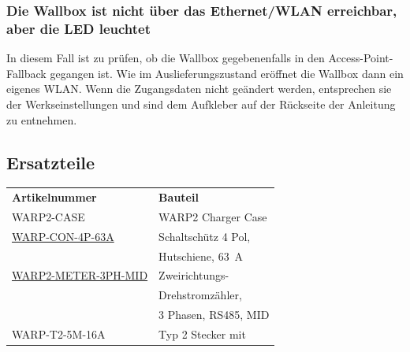 \documentclass[a4paper,10pt]{article}
\begin{document}
\begin{multicols*}{2}
	\subsubsection*{Die Wallbox ist nicht über das Ethernet/WLAN erreichbar, aber die LED leuchtet}
	In diesem Fall ist zu prüfen, ob die Wallbox gegebenenfalls in den Access-Point-Fallback
	gegangen ist. Wie im Auslieferungszustand eröffnet die Wallbox dann ein eigenes
	WLAN. Wenn die Zugangsdaten nicht geändert werden, entsprechen sie der Werkseinstellungen und sind dem
	Aufkleber auf der Rückseite der Anleitung zu entnehmen.

	\subsection{Ersatzteile}
	\begin{tabular}{ll}
		\textbf{Artikelnummer}                                                                                                   & \textbf{Bauteil}                                              \\
		\cmidrule(lr{0.5em}){1-2}		WARP2-CASE																				 & WARP2 Charger Case                                             \\
		\cmidrule(lr{0.5em}){1-2}
		\href{https://www.tinkerforge.com/de/shop/warp/contactor-4-pole-din-rail-63a.html}{WARP-CON-4P-63A}                      & Schaltschütz 4 Pol,                                           \\
		                                                                                                                         & Hutschiene, \SI{63}{\ampere}                                  \\
		\cmidrule(lr{0.5em}){1-2}
		\href{}{WARP2-METER-3PH-MID} & Zweirichtungs-                                                \\
		                                                                                                                         & Drehstromzähler,                                              \\
		                                                                                                                         & 3 Phasen, RS485, MID                                          \\
		\cmidrule(lr{0.5em}){1-2}
		WARP-T2-5M-16A                                                                                                           & Typ 2 Stecker mit                                             \\

\end{tabular}
\end{multicols*}
\end{document}
